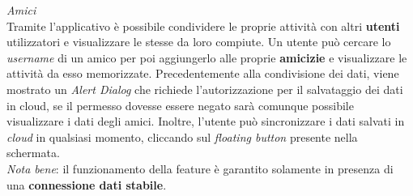 \documentclass{article}
\begin{document}
\textit{Amici} \\
Tramite l'applicativo è possibile condividere le proprie attività con altri \textbf{utenti} utilizzatori e visualizzare le stesse da loro compiute. Un utente può cercare lo \textit{username} di un amico per poi aggiungerlo alle proprie \textbf{amicizie} e visualizzare le attività da esso memorizzate.
Precedentemente alla condivisione dei dati, viene mostrato un \textit{Alert Dialog} che richiede l'autorizzazione per il salvataggio dei dati in cloud, se il permesso dovesse essere negato sarà comunque possibile visualizzare i dati degli amici.
Inoltre, l'utente può sincronizzare i dati salvati in \textit{cloud} in qualsiasi momento, cliccando sul \textit{floating button} presente nella schermata. \vspace*{7pt}\\
\textit{Nota bene}: il funzionamento della feature è garantito solamente in presenza di una \textbf{connessione dati stabile}.
\begin{figure}[H]
    \centering
\end{figure}
\end{document}
